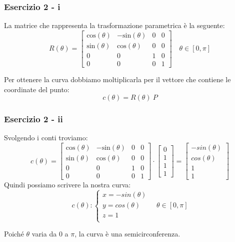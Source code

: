 \documentclass{beamer}
\begin{document}
\begin{frame}
\frametitle{Esercizio 2 - i}
La matrice che rappresenta la trasformazione parametrica \`e la seguente:
\begin{equation*}
R(\theta) = 
\begin{bmatrix}
    \mbox{cos}(\theta) & - \mbox{sin}(\theta) & 0 & 0\\
    \mbox{sin}(\theta) & \mbox{cos}(\theta)   & 0 & 0\\ 
    0 & 0 & 1 & 0 \\
    0 & 0 & 0 & 1
\end{bmatrix}
\quad
    \theta \in [0, \pi]
\end{equation*}

    Per ottenere la curva dobbiamo moltiplicarla per il vettore che contiene le coordinate del punto: 
    $$
    c(\theta) = R(\theta) \ P
    $$
\end{frame}

\begin{frame}
\frametitle{Esercizio 2 - ii}
Svolgendo i conti troviamo:
\begin{equation*}
c(\theta) = 
\begin{bmatrix}
    \mbox{cos}(\theta) & - \mbox{sin}(\theta) & 0 & 0\\
    \mbox{sin}(\theta) & \mbox{cos}(\theta)   & 0 & 0\\ 
    0 & 0 & 1 & 0 \\
    0 & 0 & 0 & 1
\end{bmatrix}
\cdot
\begin{bmatrix}
    0 \\
    1 \\
    1 \\
    1
\end{bmatrix}
 = 
\begin{bmatrix}
    -sin(\theta) \\
    cos(\theta) \\
    1 \\
    1
\end{bmatrix}
\end{equation*}
Quindi possiamo scrivere la nostra curva:
\begin{displaymath}
    c(\theta):
\begin{cases}
    x = -sin(\theta) \\
    y = cos(\theta) \\
    z = 1 \\
\end{cases}
\quad
    \theta \in [0, \pi]
\end{displaymath}

Poich\'e $\theta$ varia da $0$ a $\pi$, la curva \`e una semicirconferenza.
\end{frame}
\end{document}
